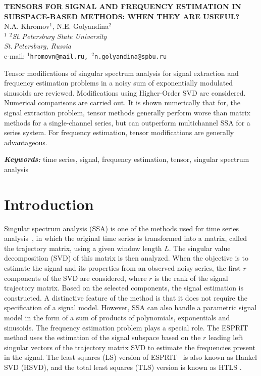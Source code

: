 \documentclass[12pt]{article}
\providecommand{\keywords}[1]
{
  \vspace{2mm}\hspace{20pt}\textbf{\textit{Keywords:}} #1
}
\providecommand{\abskeyw}[2]
{
  \begin{small}
    \begin{adjustwidth}{10mm}{10mm}
      \vspace{1mm}\hspace{20pt}#1

      \keywords{#2}
    \end{adjustwidth}
  \end{small}
}
\theoremstyle{definition}
\begin{document}
\begin{center}
  {\Large\bf TENSORS FOR SIGNAL AND FREQUENCY ESTIMATION IN
  SUBSPACE-BASED METHODS: WHEN THEY ARE USEFUL?}\\\vspace{2mm} {\sc N.A.
  Khromov$^1$, N.E. Golyandina$^2$}\\\vspace{2mm}
  {\it $^{1}$ $^{2}$St.\,Petersburg State University\\
  St.\,Petersburg, Russia\\} e-mail: {\tt $^1$hromovn@mail.ru,
  $^2$n.golyandina@spbu.ru}

  \abskeyw{Tensor modifications of singular spectrum analysis for  signal extraction and frequency estimation problems in a noisy sum  of exponentially modulated sinusoids are reviewed. Modifications using Higher-Order SVD are considered. Numerical comparisons are  carried out. It is shown numerically that for, the signal extraction problem, tensor methods generally perform worse than matrix methods for a single-channel series, but can outperform multichannel SSA for a series system. For frequency estimation, tensor modifications are generally advantageous.}{time series,
  signal, frequency estimation, tensor, singular spectrum analysis}
\end{center}

\section{Introduction}

Singular spectrum analysis (SSA) is one of the methods used for time series analysis~\cite{Golyandina2001}, in which the original time series is transformed into a matrix, called the trajectory matrix, using a given window length $L$. The singular value decomposition (SVD) of this matrix is then analyzed. When the objective is to estimate the signal and its properties from an observed noisy series, the first $r$ components of the SVD are considered, where $r$ is the rank of the signal trajectory matrix. Based on the selected components, the signal estimation is constructed. A distinctive feature of the method is that it does not require the specification of a signal model. However, SSA can also handle a parametric signal model in the form of a sum of products of polynomials, exponentials and sinusoids. The frequency estimation problem plays a special role. The ESPRIT method uses the estimation of the signal subspace based on the $r$ leading left singular vectors of the trajectory matrix SVD to estimate the frequencies present in the signal.
The least squares (LS) version of ESPRIT~\cite{Roy1986} is also known as Hankel SVD (HSVD), and the total least squares (TLS) version is known as HTLS \cite{https://www.sciencedirect.com/science/article/abs/pii/S1064185884712095}.
\end{document}

